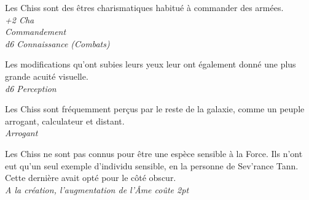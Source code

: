 \begin{description}[align=left]
\item [Charismatique] 			%
		Les Chiss sont des êtres charismatiques habitué à commander des armées.\\
		\textit{+2 Cha}\\
		\textit{Commandement}\\
		\textit{d6 Connaissance (Combats)}

\item [Acuité visuelle] 		%
		Les modifications qu’ont subies leurs yeux leur ont également donné une plus grande acuité visuelle.\\
		\textit{d6 Perception}

\item [Arrogant] 				%
		Les Chiss sont fréquemment perçus par le reste de la galaxie, comme un peuple arrogant, calculateur et distant.\\
		\textit{Arrogant}
		
\item [Insensible à la Force] 		%
		Les Chiss ne sont pas connus pour être une espèce sensible à la Force. Ils n’ont eut qu’un seul exemple d’individu sensible, en la personne de Sev’rance Tann. Cette dernière avait opté pour le côté obscur.\\
		\textit{A la création, l’augmentation de l’\^Ame coûte 2pt}
\end{description}